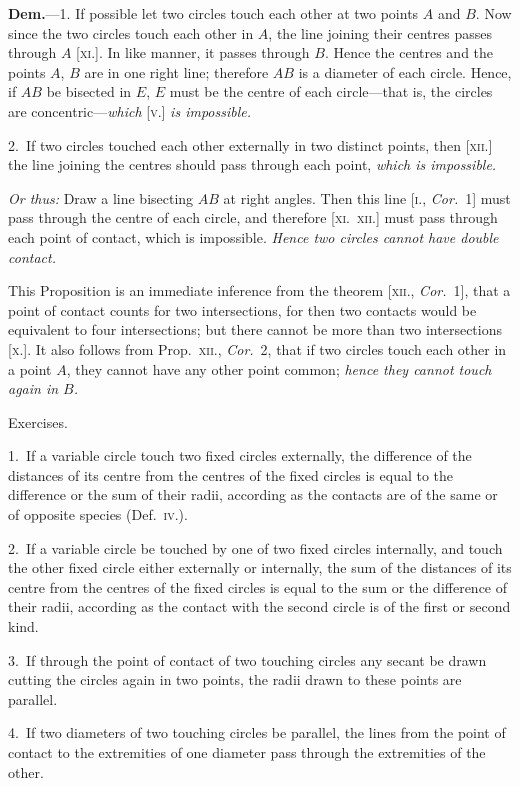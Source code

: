 \documentclass[oneside]{book}
\newcommand\exhead[1]{
\Needspace*{5\baselineskip}\begin{center}
\textsf{#1}
\end{center}
}
\begin{document}
\textbf{Dem.}---1. If possible let two circles touch each
other at two points $A$ and $B$.
Now since the two circles touch
each other in $A$, the line joining
their centres passes through $A$
[\textsc{xi.}]. In like manner, it passes
through $B$. Hence the centres
and the points $A$, $B$ are in one
right line; therefore $AB$ is a
diameter of each circle. Hence,
if $AB$ be bisected in $E$, $E$ must be the centre of each
circle---that is, the circles are concentric---\emph{which} [\textsc{v.}] \emph{is
impossible.}

2.~If two circles touched each other externally in
two distinct points, then [\textsc{xii.}] the line joining the
centres should pass through each point, \emph{which is impossible.}

\emph{Or thus:} Draw a line bisecting $AB$ at right angles.
Then this line [\textsc{i.}, \emph{Cor.}~1]\label{Icor1} must pass through the centre
of each circle, and therefore [\textsc{xi.~xii.}] must pass through
each point of contact, which is impossible. \emph{Hence two
circles cannot have double contact.}\par\medskip

\begin{footnotesize}
This Proposition is an immediate inference from the theorem
[\textsc{xii.}, \emph{Cor.}~1], that a point of contact counts for two intersections,
for then two contacts would be equivalent to four intersections;
but there cannot be more than two intersections [\textsc{x.}]. It also
follows from Prop.~\textsc{xii.}, \emph{Cor.}~2, that if two circles touch each
other in a point $A$, they cannot have any other point common;
\emph{hence they cannot touch again in $B$.}
\par\end{footnotesize}

\exhead{Exercises.}

\begin{footnotesize}
1.~If a variable circle touch two fixed circles externally, the
difference of the distances of its centre from the centres of the
fixed circles is equal to the difference or the sum of their radii,
according as the contacts are of the same or of opposite species
(Def.~\textsc{iv.}).

2.~If a variable circle be touched by one of two fixed circles
internally, and touch the other fixed circle either externally or
internally, the sum of the distances of its centre from the centres
of the fixed circles is equal to the sum or the difference of their
radii, according as the contact with the second circle is of the first
or second kind.

3.~If through the point of contact of two touching circles any
secant be drawn cutting the circles again in two points, the radii
drawn to these points are parallel.

4.~If two diameters of two touching circles be parallel, the
lines from the point of contact to the extremities of one diameter
pass through the extremities of the other.
\par\end{footnotesize}
\end{document}
